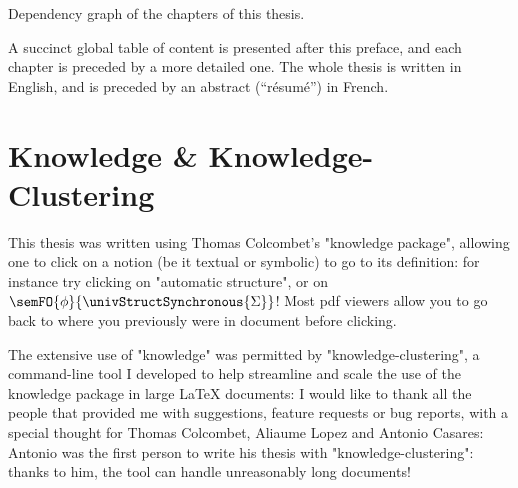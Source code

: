 \begin{marginfigure}
	\centering
	\caption{\AP\label{fig:chapter-dependency-graph}
		Dependency graph of the chapters of this thesis.}
\end{marginfigure}
A succinct global table of content is presented after this preface,
and each chapter is preceded by a more detailed one.
The whole thesis is written in English, and is preceded by an abstract (``résumé'')
in French.

\section*{Knowledge \& Knowledge-Clustering}
This thesis was written using Thomas Colcombet's "knowledge package", allowing
one to click on a notion (be it textual or symbolic) to go to its definition:
for instance try clicking on "automatic structure", or on
$\semFO{\phi}{\univStructSynchronous{\Sigma}}$!
Most pdf viewers allow you to go back to where you previously were
in document before clicking.

The extensive use of "knowledge" was permitted by "knowledge-clustering",
a command-line tool I developed to help streamline and scale the use
of the knowledge package in large LaTeX documents:
I would like to thank all the people that provided me with suggestions,
feature requests or bug reports, with a special thought for Thomas Colcombet, Aliaume Lopez
and Antonio Casares: Antonio was the first person to write his thesis
with "knowledge-clustering": thanks to him, the tool can handle
unreasonably long documents!

